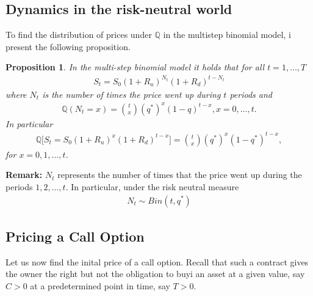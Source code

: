 \documentclass{article}
\newtheorem{proposition}[theorem]{Proposition}
\theoremstyle{definition}
\numberwithin{equation}{section}
\begin{document}
\subsection{Dynamics in the risk-neutral world}
To find the distribution of prices under $\mathbb{Q}$ in the multistep binomial model, i present the following proposition. 
\begin{proposition}
    In the multi-step binomial model it holds that for all $t = 1, \ldots, T$
    \begin{align}
        S_t = S_0(1 + R_u)^{N_t}(1+R_d)^{t-N_t}
    \end{align}
    where $N_t$ is the number of times the price went up during $t$ periods and
    \begin{align}
        \mathbb{Q}(N_t = x) = \binom{t}{x}(q^*)^x(1-q)^{t-x}, x = 0, \ldots, t. 
    \end{align}
    In particular 
    \begin{align}
        \mathbb{Q} \Big[S_t = S_0(1+R_u)^x(1+R_d)^{t-x}\Big] = \binom{t}{x} (q^*)^x(1-q^*)^{t-x},
    \end{align}
    for $x = 0, 1, \ldots, t$. 
\end{proposition}
\textbf{Remark:} $N_t$ represents the number of times that the price went up during the periods $1, 2, \ldots, t$. In particular, under the risk neutral measure
\begin{align}
    N_t \sim Bin(t, q^*)
\end{align}

\subsection{Pricing a Call Option}
Let us now find the inital price of a call option. 
Recall that such a contract gives the owner the right but not the obligation to buyi an asset at a given value, say $C > 0$ at a predetermined point in time, say $T > 0$. 
\end{document}
